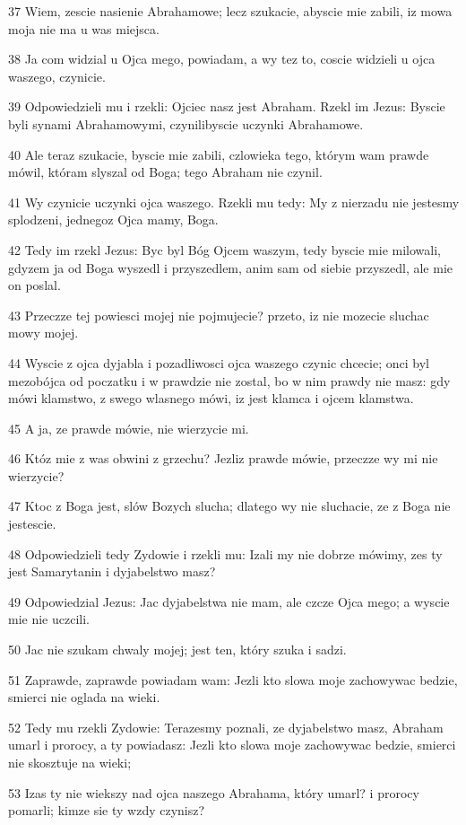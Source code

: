 \par 37 Wiem, zescie nasienie Abrahamowe; lecz szukacie, abyscie mie zabili, iz mowa moja nie ma u was miejsca.
\par 38 Ja com widzial u Ojca mego, powiadam, a wy tez to, coscie widzieli u ojca waszego, czynicie.
\par 39 Odpowiedzieli mu i rzekli: Ojciec nasz jest Abraham. Rzekl im Jezus: Byscie byli synami Abrahamowymi, czynilibyscie uczynki Abrahamowe.
\par 40 Ale teraz szukacie, byscie mie zabili, czlowieka tego, którym wam prawde mówil, któram slyszal od Boga; tego Abraham nie czynil.
\par 41 Wy czynicie uczynki ojca waszego. Rzekli mu tedy: My z nierzadu nie jestesmy splodzeni, jednegoz Ojca mamy, Boga.
\par 42 Tedy im rzekl Jezus: Byc byl Bóg Ojcem waszym, tedy byscie mie milowali, gdyzem ja od Boga wyszedl i przyszedlem, anim sam od siebie przyszedl, ale mie on poslal.
\par 43 Przeczze tej powiesci mojej nie pojmujecie? przeto, iz nie mozecie sluchac mowy mojej.
\par 44 Wyscie z ojca dyjabla i pozadliwosci ojca waszego czynic chcecie; onci byl mezobójca od poczatku i w prawdzie nie zostal, bo w nim prawdy nie masz: gdy mówi klamstwo, z swego wlasnego mówi, iz jest klamca i ojcem klamstwa.
\par 45 A ja, ze prawde mówie, nie wierzycie mi.
\par 46 Któz mie z was obwini z grzechu? Jezliz prawde mówie, przeczze wy mi nie wierzycie?
\par 47 Ktoc z Boga jest, slów Bozych slucha; dlatego wy nie sluchacie, ze z Boga nie jestescie.
\par 48 Odpowiedzieli tedy Zydowie i rzekli mu: Izali my nie dobrze mówimy, zes ty jest Samarytanin i dyjabelstwo masz?
\par 49 Odpowiedzial Jezus: Jac dyjabelstwa nie mam, ale czcze Ojca mego; a wyscie mie nie uczcili.
\par 50 Jac nie szukam chwaly mojej; jest ten, który szuka i sadzi.
\par 51 Zaprawde, zaprawde powiadam wam: Jezli kto slowa moje zachowywac bedzie, smierci nie oglada na wieki.
\par 52 Tedy mu rzekli Zydowie: Terazesmy poznali, ze dyjabelstwo masz, Abraham umarl i prorocy, a ty powiadasz: Jezli kto slowa moje zachowywac bedzie, smierci nie skosztuje na wieki;
\par 53 Izas ty nie wiekszy nad ojca naszego Abrahama, który umarl? i prorocy pomarli; kimze sie ty wzdy czynisz?

